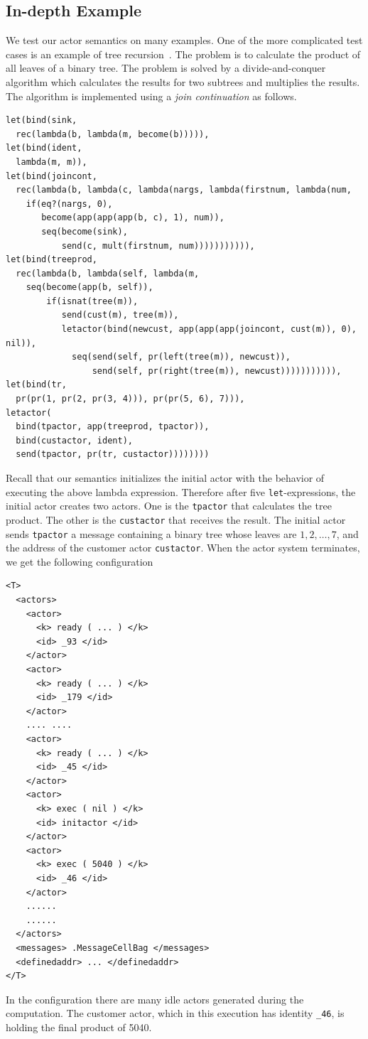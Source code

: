 \documentclass{llncs}
\begin{document}
\subsection{In-depth Example}
We test our actor semantics on many examples. One of the more complicated test
cases is an example of tree recursion~\cite{actor}.  The problem is to calculate
the product of all leaves of a binary tree.  The problem is solved by a
divide-and-conquer algorithm which calculates the results for two subtrees and
multiplies the results.  The algorithm is implemented using a
\emph{join continuation} as follows.
\small
\begin{verbatim}
let(bind(sink,
  rec(lambda(b, lambda(m, become(b))))),
let(bind(ident,
  lambda(m, m)),
let(bind(joincont,
  rec(lambda(b, lambda(c, lambda(nargs, lambda(firstnum, lambda(num,
    if(eq?(nargs, 0),
       become(app(app(app(b, c), 1), num)),
       seq(become(sink),
           send(c, mult(firstnum, num))))))))))),
let(bind(treeprod,
  rec(lambda(b, lambda(self, lambda(m,
    seq(become(app(b, self)),
        if(isnat(tree(m)),
           send(cust(m), tree(m)),
           letactor(bind(newcust, app(app(app(joincont, cust(m)), 0), nil)),
             seq(send(self, pr(left(tree(m)), newcust)),
                 send(self, pr(right(tree(m)), newcust))))))))))),
let(bind(tr, 
  pr(pr(1, pr(2, pr(3, 4))), pr(pr(5, 6), 7))),
letactor(
  bind(tpactor, app(treeprod, tpactor)),
  bind(custactor, ident),
  send(tpactor, pr(tr, custactor))))))))
\end{verbatim}
\normalsize
Recall that our semantics initializes the initial actor with the behavior of 
executing the above lambda expression.
Therefore after five \texttt{let}-expressions, the initial actor creates two 
actors. One is the \texttt{tpactor} that calculates the tree product.
The other is the \texttt{custactor} that receives the result.
The initial actor sends \texttt{tpactor} a message containing a binary tree 
whose leaves are $1, 2, \dots, 7$, and the address of the customer actor 
\texttt{custactor}.
When the actor system terminates, we get the following configuration
\begin{verbatim}
<T>
  <actors>
    <actor>
      <k> ready ( ... ) </k>
      <id> _93 </id>
    </actor>
    <actor>
      <k> ready ( ... ) </k>
      <id> _179 </id>
    </actor>
    .... ....
    <actor>
      <k> ready ( ... ) </k>
      <id> _45 </id>
    </actor>
    <actor>
      <k> exec ( nil ) </k>
      <id> initactor </id>
    </actor>
    <actor>
      <k> exec ( 5040 ) </k>
      <id> _46 </id>
    </actor>
    ......
    ......
  </actors>
  <messages> .MessageCellBag </messages>
  <definedaddr> ... </definedaddr>
</T>
\end{verbatim}
In the configuration there are many idle actors generated during the 
computation. The customer actor, which in this execution has identity 
\texttt{\_46}, is holding the final product of 5040.
\end{document}
